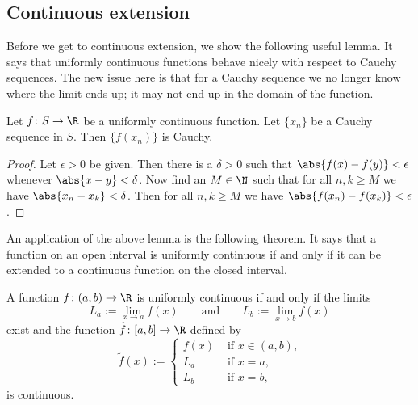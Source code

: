 \documentclass[12pt]{book}
\begin{document}
\subsection*{Continuous extension}

Before we get to continuous extension, we show the following useful lemma.
It says that uniformly continuous functions behave nicely with respect
to Cauchy sequences.
The new issue here is that for a Cauchy sequence
we no longer know where the limit ends up; it may not end up in the domain
of the function.

\begin{lemma} \label{unifcauchycauchy:lemma}
Let $f \colon S \to \R$ be a uniformly continuous function.
Let
$\{ x_n \}$ be a Cauchy sequence in $S$.
Then $\{ f(x_n) \}$ is Cauchy.
\end{lemma}

\begin{proof}
Let $\epsilon > 0$ be given.
Then there is a $\delta > 0$ such that
$\abs{f(x)-f(y)} < \epsilon$ whenever $\abs{x-y} < \delta$.
Now find an $M
\in \N$ such that for all $n, k \geq M$ we have $\abs{x_n-x_k} < \delta$.
Then for all $n, k \geq M$ we have $\abs{f(x_n)-f(x_k)} < \epsilon$.
\end{proof}

An application of the above lemma is the following theorem.
It says that
a function on an open interval is uniformly continuous if and only if
it can be extended to a continuous function on the closed interval.

\begin{thm} \label{context:thm}
A function $f \colon (a,b) \to \R$ is uniformly continuous if and only if
the limits 
\begin{equation*}
L_a := \lim_{x \to a} f(x) \qquad \text{and} \qquad
L_b := \lim_{x \to b} f(x)
\end{equation*}
exist and the function $\widetilde{f} \colon [a,b] \to \R$
defined by
\begin{equation*}
\widetilde{f}(x) :=
\begin{cases}
f(x) & \text{ if $x \in (a,b)$,} \\
L_a & \text{ if $x = a$,} \\
L_b & \text{ if $x = b$,}
\end{cases}
\end{equation*}
is continuous.
\end{thm}
\end{document}
